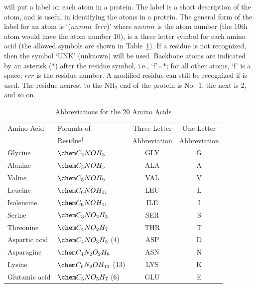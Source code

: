  will put a label on each atom in a protein.  The label is
a short description
of the atom, and is useful in identifying the atoms in a protein.
The general form of the label for an atom is `($nnnnn$~f$rrr$)' where
$nnnnn$ is the atom number (the 10th atom would have the atom number 10),
 is a three letter symbol for each amino acid  (the allowed
symbols are shown
in Table~\ref{aacids}). If a residue is not recognized, then the symbol `UNK'
(unknown) will be used.
Backbone atoms are indicated by an asterisk ($*$) after the residue symbol, i.e.,
`f'=$*$; for all other atoms, `f' is a space;
 $rrr$ is the residue number.  A modified residue can still
be recognized if  is used.
The residue nearest to the NH$_2$ end of the protein is No.~1, the next is 2,
and so on.
\begin{table}
\begin{center}
\caption{\label{aacids}Abbreviations for the 20 Amino Acids}
 \begin{tabular}{llcc}\\ \hline
Amino Acid      & Formula of         &  Three-Letter & One-Letter \\
                & Residue$^{\dag}$   & Abbreviation  & Abbreviation \\ \hline
Glycine         & $\chem C_2NOH_3$               & GLY           & G  \\
Alanine         & $\chem C_3NOH_5$               & ALA           & A  \\
Valine          & $\chem C_5NOH_9$               & VAL           & V  \\
Leucine         & $\chem C_6NOH_{11}$            & LEU           & L  \\
Isoleucine      & $\chem C_6NOH_{11}$            & ILE           & I  \\
Serine          & $\chem C_3NO_2H_5$             & SER           & S  \\
Threonine       & $\chem C_4NO_2H_7$             & THR           & T  \\
Aspartic acid   & $\chem C_4NO_3H_5$ (4)     & ASP           & D  \\
Asparagine      & $\chem C_4N_2O_2H_6$           & ASN           & N  \\
Lysine          & $\chem C_6N_2OH_{12}$ (13)& LYS           & K  \\
Glutamic acid   & $\chem C_5NO_3H_7$ (6)      & GLU           & E  \\

\end{tabular}
\end{center}
\end{table}

